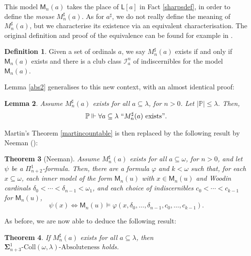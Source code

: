 \documentclass[10pt]{amsart}
\renewcommand\le\leqslant
\newtheorem{theorem}{Theorem}[section]
\newtheorem{lemma}[theorem]{Lemma}
\theoremstyle{definition}
\newtheorem{definition}[theorem]{Definition}
\begin{document}
This model $\mathsf M_n(a)$ takes the place of $\mathsf L[a]$ in Fact \ref{sharpsdef}, in order to define the \emph{mouse} $M_n^\sharp(a)$. As for $a^\sharp$, we do not really define the meaning of $M_n^\sharp(a)$, but we characterise its existence via an equivalent characterisation. The original definition and proof of the equivalence can be found for example in \cite[Section 5.1]{Schimmer}.

\begin{definition}
     Given a set of ordinals $a$, we say $M_n^\sharp(a)$ exists if and only if $\mathsf M_n(a)$ exists and there is a club class $\mathcal I^n_a$ of indiscernibles for the model $\mathsf M_n(a)$.
\end{definition}

Lemma \ref{abs2} generalises to this new context, with an almost identical proof:

\begin{lemma}\label{abs4}
Assume $M_n^\sharp(a)$ exists for all $a\subseteq\lambda$, for $n>0$. Let  $|\mathbb P|\le\lambda$. Then,
\[\mathbb P \Vdash \forall a\subseteq\lambda\ ``M_n^\sharp(a)\ \text{exists}".\]
\end{lemma}

Martin's Theorem \ref{martincountable} is then replaced by the following result by Neeman (\cite{Neeman}):

\begin{theorem}[Neeman]\label{neeeeeeman}
Assume $M_n^\sharp(a)$ exists for all $a\subseteq\omega$, for $n>0$, and let $\psi$ be a $\Pi^1_{n+2}$-formula. Then, there are a formula $\varphi$ and $k<\omega$ such that, for each $x\subseteq\omega$, each inner model of the form $\mathsf M_n(u)$ with $x\in\mathsf M_n(u)$ and Woodin cardinals $\delta_0<\cdots<\delta_{n-1}<\omega_1$, and each choice of indiscernibles $c_0<\cdots<c_{k-1}$ for $\mathsf M_n(u)$,
\[\psi(x) \Leftrightarrow \mathsf M_n(u)\models \varphi(x,\delta_0,\ldots,\delta_{n-1},c_0,\ldots,c_{k-1}).\]

\end{theorem}

As before, we are now able to deduce the following result:

\begin{theorem}\label{neemancons}
If $M_n^\sharp(a)$ exists for all $a\subseteq\lambda$, then $ \boldsymbol\Sigma^1_{n+3}\text{-}\mathrm{Coll}(\omega,\lambda)\text{-Absoluteness}$ holds.%
\end{theorem}
\end{document}
